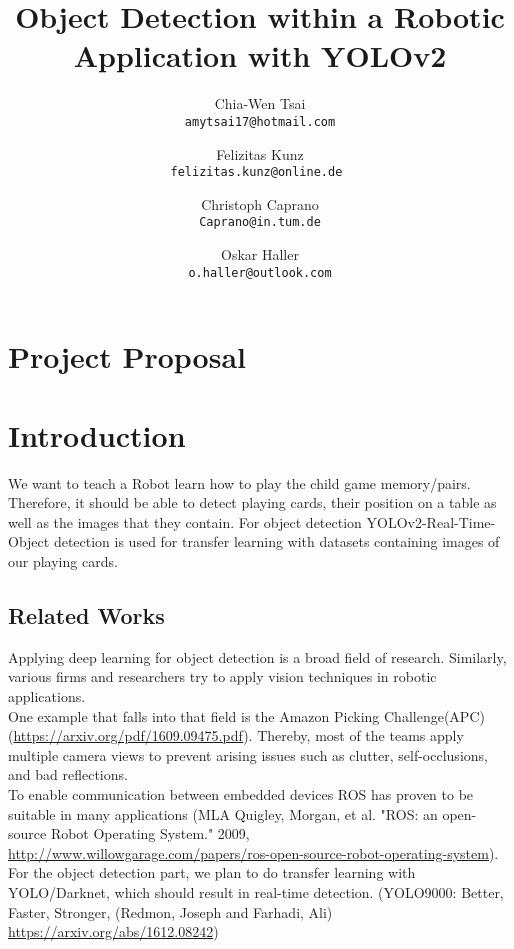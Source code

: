 \documentclass[10pt,twocolumn,letterpaper]{article}
\begin{document}
\title{Object Detection within a Robotic Application with YOLOv2}

\author{Chia-Wen Tsai\\
{\tt\small amytsai17@hotmail.com}
\and
Felizitas Kunz\\
{\tt\small felizitas.kunz@online.de }
\and
Christoph Caprano\\
{\tt\small Caprano@in.tum.de}
\and
Oskar Haller\\
{\tt\small o.haller@outlook.com}
}


\maketitle

%
%
\section*{Project Proposal}

\section{Introduction}
	   We want to teach a Robot learn how to play the child game memory/pairs. Therefore, it should be able to detect playing cards, their position on a table as well as the images that they contain. For object detection YOLOv2-Real-Time-Object detection is used for transfer learning with datasets containing images of our playing cards.
    \subsection{Related Works}
        Applying deep learning for object detection is a broad field of research. Similarly, various firms and researchers try to apply vision techniques in robotic applications.\\
        One example that falls into that field is the Amazon Picking Challenge(APC) (\href{https://arxiv.org/pdf/1609.09475.pdf}{https://arxiv.org/pdf/1609.09475.pdf}). Thereby, most of the teams apply multiple camera views to prevent arising issues such as clutter, self-occlusions, and bad reflections.\\
        To enable communication between embedded devices ROS has proven to be suitable in many applications (MLA	
        Quigley, Morgan, et al. "ROS: an open-source Robot Operating System." 2009, \href{http://www.willowgarage.com/papers/ros-open-source-robot-operating-system}{http://www.willowgarage.com/papers/ros-open-source-robot-operating-system}).\\
        For the object detection part, we plan to do transfer learning with YOLO/Darknet, which should result in real-time detection. (YOLO9000: Better, Faster, Stronger, (Redmon, Joseph and Farhadi, Ali)
\href{https://arxiv.org/abs/1612.08242}{https://arxiv.org/abs/1612.08242})  
\end{document}
